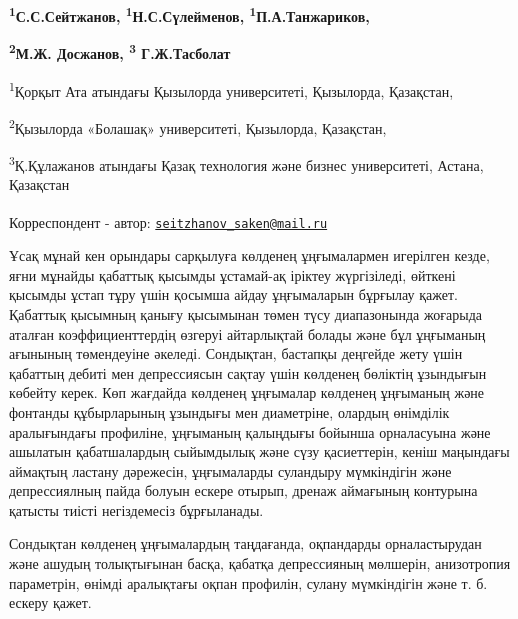 
\begin{articleheader}


{\bfseries \textsuperscript{1}С.С.Сейтжанов\textsuperscript{\envelope},
\textsuperscript{1}Н.С.Сүлейменов, \textsuperscript{1}П.А.Танжариков,}

{\bfseries \textsuperscript{2}М.Ж. Досжанов, \textsuperscript{3} Г.Ж.Тасболат}
\end{articleheader}
\begin{affiliation}
\textsuperscript{1}Қорқыт Ата атындағы Қызылорда университеті,
Қызылорда, Қазақстан,

\textsuperscript{2}Қызылорда «Болашақ» университеті, Қызылорда,
Қазақстан,

\textsuperscript{3}Қ.Құлажанов атындағы Қазақ технология және бизнес
университеті, Астана, Қазақстан

\raggedright {\bfseries \textsuperscript{\envelope }}Корреспондент - автор: \href{mailto:seitzhanov_saken@mail.ru}{\nolinkurl{seitzhanov\_saken@mail.ru}}
\end{affiliation}

Ұсақ мұнай кен орындары сарқылуға көлденең ұңғымалармен игерілген кезде,
яғни мұнайды қабаттық қысымды ұстамай-ақ іріктеу жүргізіледі, өйткені
қысымды ұстап тұру үшін қосымша айдау ұңғымаларын бұрғылау қажет.
Қабаттық қысымның қанығу қысымынан төмен түсу диапазонында жоғарыда
аталған коэффициенттердің өзгеруі айтарлықтай болады және бұл ұңғыманың
ағынының төмендеуіне әкеледі. Сондықтан, бастапқы деңгейде жету үшін
қабаттың дебиті мен депрессиясын сақтау үшін көлденең бөліктің ұзындығын
көбейту керек. Көп жағдайда көлденең ұңғымалар көлденең ұңғыманың және
фонтанды құбырларының ұзындығы мен диаметріне, олардың өнімділік
аралығындағы профиліне, ұңғыманың қалыңдығы бойынша орналасуына және
ашылатын қабатшалардың сыйымдылық және сүзу қасиеттерін, кеніш маңындағы
аймақтың ластану дәрежесін, ұңғымаларды суландыру мүмкіндігін және
депрессиялның пайда болуын ескере отырып, дренаж аймағының контурына
қатысты тиісті негіздемесіз бұрғыланады.

Сондықтан көлденең ұңғымалардың таңдағанда, оқпандарды орналастырудан
және ашудың толықтығынан басқа, қабатқа депрессияның мөлшерін,
анизотропия параметрін, өнімді аралықтағы оқпан профилін, сулану
мүмкіндігін және т. б. ескеру қажет.


